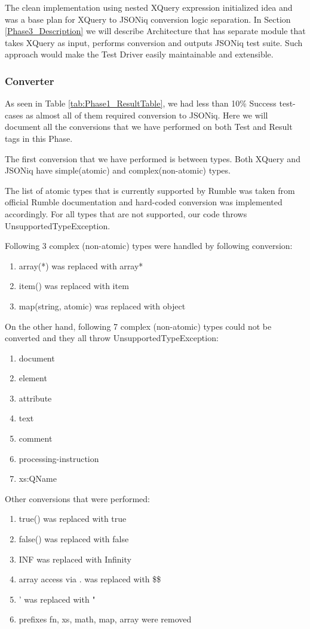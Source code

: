 The clean implementation using nested XQuery expression initialized idea and was a base plan for XQuery to JSONiq conversion logic separation. In Section \ref{Phase3_Description} we will describe Architecture that has separate module that takes XQuery as input, performs conversion and outputs JSONiq test suite. Such approach would make the Test Driver easily maintainable and extensible.

\subsubsection{Converter}
\label{Phase2_Converter}
As seen in Table \ref{tab:Phase1_ResultTable}, we had less than 10\% Success test-cases as almost all of them required conversion to JSONiq. Here we will document all the conversions that we have performed on both Test and Result tags in this Phase. 

The first conversion that we have performed is between types. Both XQuery and JSONiq have simple(atomic) and complex(non-atomic) types. 

The list of atomic types that is currently supported by Rumble was taken from official Rumble documentation \cite{RumbleSupportedTypes} and hard-coded conversion was implemented accordingly. For all types that are not supported, our code throws UnsupportedTypeException. 

Following 3 complex (non-atomic) types were handled by following conversion:
\begin{enumerate}
	\item array(*) was replaced with array*
	\item item() was replaced with item
	\item map(string, atomic) was replaced with object 
\end{enumerate}

On the other hand, following 7 complex (non-atomic) types could not be converted and they all throw UnsupportedTypeException:
\begin{enumerate}
	\item document
	\item element
	\item attribute
	\item text
	\item comment
	\item processing-instruction
	\item xs:QName
\end{enumerate}

Other conversions that were performed:
\begin{enumerate}
	\item true() was replaced with true
	\item false() was replaced with false
	\item INF was replaced with Infinity
	\item array access via . was replaced with \$\$
	\item ' was replaced with "
	\item prefixes fn, xs, math, map, array were removed
\end{enumerate}

